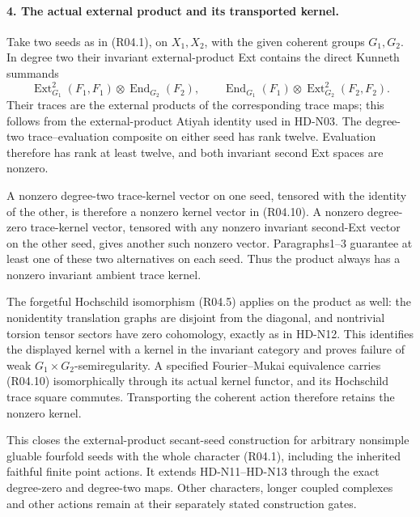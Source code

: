\paragraph{4. The actual external product and its transported kernel.}
Take two seeds as in (R04.1), on $X_1,X_2$, with the given coherent
groups $G_1,G_2$. In degree two their invariant external-product Ext
contains the direct Kunneth summands
\[
 \operatorname{Ext}^2_{G_1}(F_1,F_1)\otimes
       \operatorname{End}_{G_2}(F_2),\qquad
 \operatorname{End}_{G_1}(F_1)\otimes
       \operatorname{Ext}^2_{G_2}(F_2,F_2).                       \tag{R04.10}
\]
Their traces are the external products of the corresponding trace
maps; this follows from the external-product Atiyah identity used
in HD-N03. The degree-two trace--evaluation composite on either seed has rank
twelve. Evaluation therefore has rank at least twelve, and both
invariant second Ext spaces are nonzero.

A nonzero degree-two trace-kernel vector on one seed, tensored with
the identity of the other, is therefore a nonzero kernel vector in
(R04.10). A nonzero degree-zero trace-kernel vector, tensored with
any nonzero invariant second-Ext vector on the other seed, gives
another such nonzero vector. Paragraphs1--3 guarantee at least one
of these two alternatives on each seed. Thus the product always has
a nonzero invariant ambient trace kernel.

The forgetful Hochschild isomorphism (R04.5) applies on the product
as well: the nonidentity translation graphs are disjoint from the
diagonal, and nontrivial torsion tensor sectors have zero cohomology,
exactly as in HD-N12. This identifies the displayed kernel with a
kernel in the invariant category and proves failure of weak
$G_1\times G_2$-semiregularity. A specified Fourier--Mukai equivalence
carries (R04.10) isomorphically through its actual kernel functor,
and its Hochschild trace square commutes. Transporting the coherent
action therefore retains the nonzero kernel.

This closes the external-product secant-seed construction for arbitrary
nonsimple gluable fourfold seeds with the whole character (R04.1),
including the inherited faithful finite point actions. It extends
HD-N11--HD-N13 through the exact degree-zero and degree-two maps.
Other characters, longer coupled complexes and other actions remain
at their separately stated construction gates.
